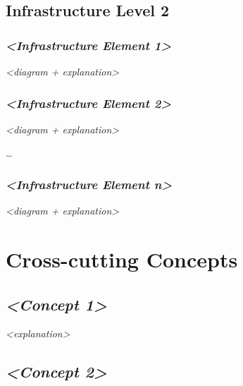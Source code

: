 \documentclass[]{article}
\begin{document}
\subsection{Infrastructure Level 2}\label{_infrastructure_level_2}

\subsubsection{\texorpdfstring{\emph{\textless{}Infrastructure Element
1\textgreater{}}}{\textless{}Infrastructure Element 1\textgreater{}}}\label{__emphasis_infrastructure_element_1_emphasis}

\emph{\textless{}diagram + explanation\textgreater{}}

\subsubsection{\texorpdfstring{\emph{\textless{}Infrastructure Element
2\textgreater{}}}{\textless{}Infrastructure Element 2\textgreater{}}}\label{__emphasis_infrastructure_element_2_emphasis}

\emph{\textless{}diagram + explanation\textgreater{}}

\ldots{}

\subsubsection{\texorpdfstring{\emph{\textless{}Infrastructure Element
n\textgreater{}}}{\textless{}Infrastructure Element n\textgreater{}}}\label{__emphasis_infrastructure_element_n_emphasis}

\emph{\textless{}diagram + explanation\textgreater{}}

\section{Cross-cutting Concepts}\label{section-concepts}

\subsection{\texorpdfstring{\emph{\textless{}Concept
1\textgreater{}}}{\textless{}Concept 1\textgreater{}}}\label{__emphasis_concept_1_emphasis}

\emph{\textless{}explanation\textgreater{}}

\subsection{\texorpdfstring{\emph{\textless{}Concept
2\textgreater{}}}{\textless{}Concept 2\textgreater{}}}\label{__emphasis_concept_2_emphasis}
\end{document}
